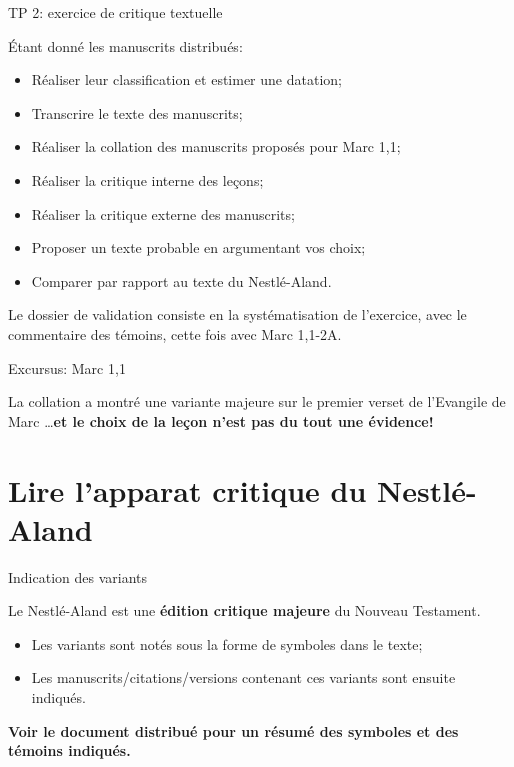 \documentclass[11pt]{beamer}
\begin{document}
\begin{frame}{TP 2: exercice de critique textuelle}
    \begin{block}{}
        Étant donné les manuscrits distribués:
        \begin{itemize}
            \item Réaliser leur classification et estimer une datation;
            \item Transcrire le texte des manuscrits;
            \item Réaliser la collation des manuscrits proposés pour Marc 1,1;
            \item Réaliser la critique interne des leçons;
            \item Réaliser la critique externe des manuscrits;
            \item Proposer un texte probable en argumentant vos choix;
            \item Comparer par rapport au texte du Nestlé-Aland.
        \end{itemize}
    \end{block}
    \begin{alertblock}{}
        Le dossier de validation consiste en la systématisation de l'exercice, avec le commentaire des témoins, cette fois avec Marc 1,1-2A.
    \end{alertblock}
\end{frame}


\begin{frame}{Excursus: Marc 1,1}
    \begin{alertblock}{}
La collation a montré une variante majeure sur le premier verset de l'Evangile de Marc \dots \textbf{et le choix de la leçon n'est pas du tout une évidence!}
    \end{alertblock}
\end{frame}


\section{Lire l'apparat critique du Nestlé-Aland}

\begin{frame}{Indication des variants}
    \begin{alertblock}{}
Le Nestlé-Aland est une \textbf{édition critique majeure} du Nouveau Testament.
    \end{alertblock}
    \pause
    \begin{itemize}
        \item Les variants sont notés sous la forme de symboles dans le texte;
        \item Les manuscrits/citations/versions contenant ces variants sont ensuite indiqués.
    \end{itemize}
    \textbf{Voir le document distribué pour un résumé des symboles et des témoins indiqués.}
\end{frame}
\end{document}
